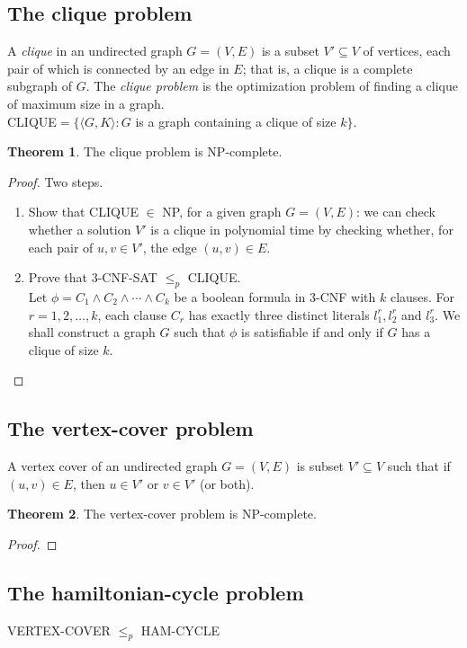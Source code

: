 \documentclass[letter]{book}
\theoremstyle{definition}
\newtheorem{theorem}{Theorem}[chapter]
\theoremstyle{definition}
\theoremstyle{remark}
\begin{document}
\subsection{The clique problem}
A \textit{clique} in an undirected graph $G=(V,E)$ is a subset $V'\subseteq V$ of vertices, each pair of which is connected by an edge in $E$; that is, a clique is a complete subgraph of $G$. The \textit{clique problem} is the optimization problem of finding a clique of maximum size in a graph.\\
CLIQUE$=\{\langle G, K\rangle:G$ is a graph containing a clique of size $k\}$.
\bigskip
\setcounter{theorem}{10}
\begin{theorem}
    The clique problem is NP-complete.
\end{theorem}
\begin{proof} Two steps.\\
    \begin{enumerate}
        \item Show that CLIQUE $\in$ NP, for a given graph $G=(V,E)$: we can check whether a solution $V'$ is a clique in polynomial time by checking whether, for each pair of $u,v\in V'$, the edge $(u,v)\in E$.
        \item Prove that $3$-CNF-SAT $\leq_p$ CLIQUE.\\
        Let $\phi=C_1\land C_2\land\cdots\land C_k$ be a boolean formula in $3$-CNF with $k$ clauses. For $r=1,2,\ldots,k$, each clause $C_r$ has exactly three distinct literals $l_1^r,l_2^r$ and $l_3^r$. We shall construct a graph $G$ such that $\phi$ is satisfiable if and only if $G$ has a clique of size $k$.
    \end{enumerate}
\end{proof}
\subsection{The vertex-cover problem}
A vertex cover of an undirected graph $G=(V,E)$ is subset $V'\subseteq V$ such that if $(u,v)\in E$, then $u\in V'$ or $v\in V'$ (or both).
\bigskip
\begin{theorem}
    The vertex-cover problem is NP-complete.
\end{theorem}
\begin{proof}
    
\end{proof}
\subsection{The hamiltonian-cycle problem}
VERTEX-COVER $\leq_p$ HAM-CYCLE
\end{document}

